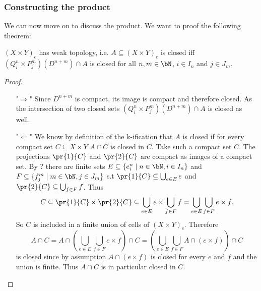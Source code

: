 \subsubsection{Constructing the product}

We can now move on to discuss the product.
We want to proof the following theorem: 

\begin{thm}
    
\end{thm}

\begin{lem}
    $(X \times Y)_c$ has weak topology,
    i.e. $A \subseteq (X \times Y)_c$ is closed iff $(Q_i^n \times P_j^m)(D^{n + m}) \cap A$ is closed for all $n, m \in \bN$, $i \in I_n$ and $j \in J_m$.
\end{lem}
\begin{proof}~
    \begin{enumerate}
        \item["$\Rightarrow$"] Since $D^{n + m}$ is compact, its image is compact and therefore closed. As the intersection of two closed sets $(Q_i^n \times P_j^m)(D^{n + m}) \cap A$ is closed as well.
        \item["$\Leftarrow$"] We know by definition of the k-ification that $A$ is closed if for every compact set $C \subseteq X \times Y$ $A \cap C$ is closed in $C$.
        Take such a compact set $C$.
        The projections $\pr{1}{C}$ and $\pr{2}{C}$ are compact as images of a compact set. 
        By ? there are finite sets $E \subseteq \{e_i^n \mid n \in \bN, i \in I_n \}$ and $F \subseteq \{f_j^m \mid m \in \bN, j \in J_m \}$ s.t $\pr{1}{C} \subseteq \bigcup_{e \in E} e$ and $\pr{2}{C} \subseteq \bigcup_{f \in F} f$.
        Thus 
        \[C \subseteq \pr{1}{C} \times \pr{2}{C} \subseteq \bigcup_{e \in E} e \times \bigcup_{f \in F} f = \bigcup_{e \in E} \bigcup_{f \in F} e \times f.\] 
        So $C$ is included in a finite union of cells of $(X \times Y)_c$. 
        Therefore 
        \[A \cap C = A \cap \left (\bigcup_{e \in E} \bigcup_{f \in F} e \times f \right )\cap C = \left (\bigcup_{e \in E} \bigcup_{f \in F} A \cap (e \times f)\right ) \cap C\] 
        is closed since by assumption $A \cap (e \times f)$ is closed for every $e$ and $f$ and the union is finite. Thus $A \cap C$ is in particular closed in $C$.
    \qedhere
    \end{enumerate}
\end{proof}
